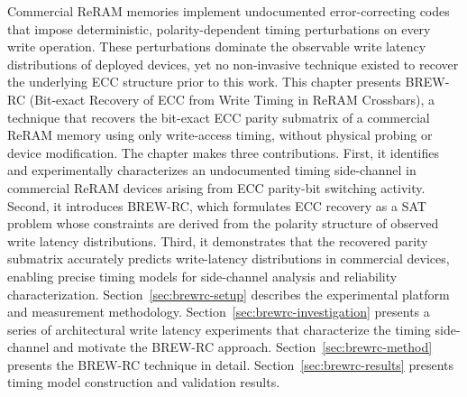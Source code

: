\label{chap:brewrc}

Commercial ReRAM memories implement undocumented error-correcting codes
that impose deterministic, polarity-dependent timing perturbations on
every write operation. These perturbations dominate the observable write
latency distributions of deployed devices, yet no non-invasive technique
existed to recover the underlying ECC structure prior to this work. This
chapter presents BREW-RC (Bit-exact Recovery of ECC from Write Timing in
ReRAM Crossbars), a technique that recovers the bit-exact ECC parity
submatrix of a commercial ReRAM memory using only write-access timing,
without physical probing or device modification. The chapter makes three
contributions. First, it identifies and experimentally characterizes an
undocumented timing side-channel in commercial ReRAM devices arising
from ECC parity-bit switching activity. Second, it introduces BREW-RC,
which formulates ECC recovery as a SAT problem whose constraints are
derived from the polarity structure of observed write latency
distributions. Third, it demonstrates that the recovered parity
submatrix accurately predicts write-latency distributions in commercial
devices, enabling precise timing models for side-channel analysis and
reliability characterization. Section~\ref{sec:brewrc-setup} describes
the experimental platform and measurement methodology.
Section~\ref{sec:brewrc-investigation} presents a series of
architectural write latency experiments that characterize the timing
side-channel and motivate the BREW-RC approach.
Section~\ref{sec:brewrc-method} presents the BREW-RC technique in
detail. Section~\ref{sec:brewrc-results} presents timing model
construction and validation results.
